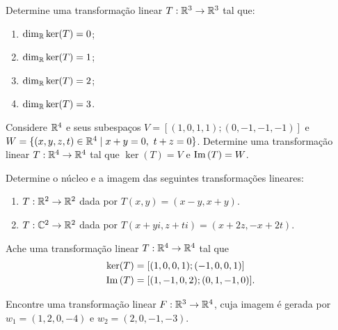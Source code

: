 \documentclass[12pt]{exam}
\begin{document}
\begin{exercicio}
    Determine uma transformação linear $T : \mathbb{R}^3 \to \mathbb{R}^3$ tal que:
    \begin{enumerate}[label={\alph*})]
        \item $\dim_{\mathbb{R}} \ker(T) = 0$;

        \item $\dim_{\mathbb{R}} \ker(T) = 1$;

        \item $\dim_{\mathbb{R}} \ker(T) = 2$;

        \item $\dim_{\mathbb{R}} \ker(T) = 3$.
    \end{enumerate}
\end{exercicio}

\begin{exercicio}
    Considere $\mathbb{R}^4$ e seus subespaços $V = [(1,0,1,1);(0,-1,-1,-1)]$ e $W = \{(x,y,z,t) \in \mathbb{R}^4 \mid x + y = 0,\ t + z = 0\}$. Determine uma transformação linear $T : \mathbb{R}^4 \to \mathbb{R}^4$ tal que $\ker(T) = V$ e ${\rm Im\,}(T) = W$.
\end{exercicio}

\begin{exercicio}
    Determine o n\'ucleo e a imagem das seguintes transformações lineares:
    \begin{enumerate}[label={\alph*})]
        \item $T : \mathbb{R}^2 \to \mathbb{R}^2$ dada por $T(x,y) = (x - y, x + y)$.

        \item $T : \mathbb{C}^2 \to \mathbb{R}^2$ dada por $T(x + yi,z + ti) = (x + 2z, -x + 2t)$.
    \end{enumerate}
\end{exercicio}

\begin{exercicio}
    Ache uma transformação linear $T : \mathbb{R}^4 \to \mathbb{R}^4$ tal que
    \begin{align*}
        \ker(T) &= [(1,0,0,1);(-1,0,0,1)]\\
        {\rm Im\,}(T) &= [(1,-1,0,2);(0,1,-1,0)].
    \end{align*}
\end{exercicio}

\begin{exercicio}
    Encontre uma transformação linear $F : \mathbb{R}^3 \to \mathbb{R}^4$, cuja imagem é gerada por $w_1 = (1,2,0,-4)$ e $w_2 = (2,0,-1,-3)$.
\end{exercicio}
\end{document}
